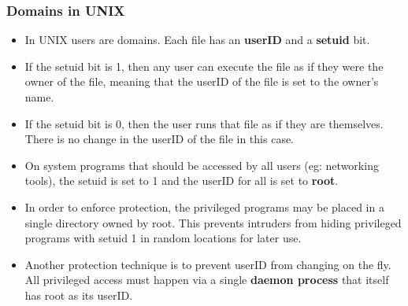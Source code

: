 \documentclass{article}
\theoremstyle{plain}
\theoremstyle{definition}
\begin{document}
\subsubsection{Domains in UNIX}
\begin{itemize}
    \item In UNIX users are domains. Each file has an \textbf{userID} and a \textbf{setuid} bit. 
    
    \item If the setuid bit is 1, then any user can execute the file as if they were the owner of the file, meaning that the userID of the file is set to the owner's name.
    
    \item If the setuid bit is 0, then the user runs that file as if they are themselves. There is no change in the userID of the file in this case. 
    
    \item On system programs that should be accessed by all users (eg: networking tools), the setuid is set to 1 and the userID for all is set to \textbf{root}. 
    
    \item In order to enforce protection, the privileged programs may be placed in a single directory owned by root. This prevents intruders from hiding privileged programs with setuid 1 in random locations for later use. 
    
    \item Another protection technique is to prevent userID from changing on the fly. All privileged access must happen via a single \textbf{daemon process} that itself has root as its userID. 
\end{itemize}
\end{document}
